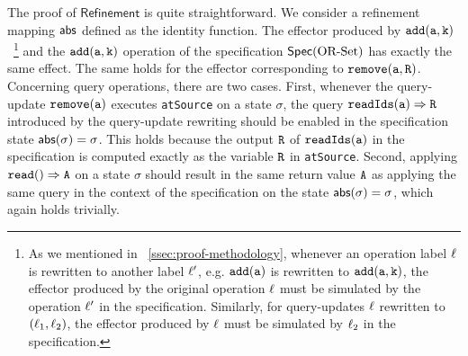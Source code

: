 The proof of $\mathsf{Refinement}$ is quite straightforward. We consider a refinement mapping $\mathsf{abs}$ defined as the identity function. The effector produced by $\alabelshort[{\tt add}]{a,k}$~\footnote{As we mentioned in \sectionautorefname~\ref{ssec:proof-methodology}, whenever an operation label $\ell$ is rewritten to another label $\ell'$, e.g. $\alabelshort[{\tt add}]{a}$ is rewritten to $\alabelshort[{\tt add}]{a,k}$, the effector produced by the original operation $\ell$ must be simulated by the operation $\ell'$ in the specification. Similarly, for query-updates $\ell$ rewritten to $(\ell_1,\ell_2)$, the effector produced by $\ell$ must be simulated by $\ell_2$ in the specification.} and the $\alabelshort[{\tt add}]{a,k}$ operation of the specification $\mathsf{Spec}(\text{OR\text{-}Set})$ has exactly the same effect. The same holds for the effector corresponding to $\alabelshort[{\tt remove}]{a,R}$. Concerning query operations, there are two cases. First, whenever the query-update $\alabelshort[{\tt remove}]{a}$ executes \lstinline|atSource| on a state $\sigma$, the query $\alabellong[{\tt readIds}]{a}{R}{}$ introduced by the query-update rewriting should be enabled in the specification state $\mathsf{abs}(\sigma)=\sigma$. This holds because the output ${\tt R}$ of ${\tt readIds(a)}$ in the specification is computed exactly as the variable ${\tt R}$ in \lstinline|atSource|.
Second, applying $\alabellongind[{\tt read}]{}{A}{}$ on a state $\sigma$ should result in the same return value ${\tt A}$ as applying the same query in the context of the specification on the state $\mathsf{abs}(\sigma)=\sigma$, which again holds trivially.

